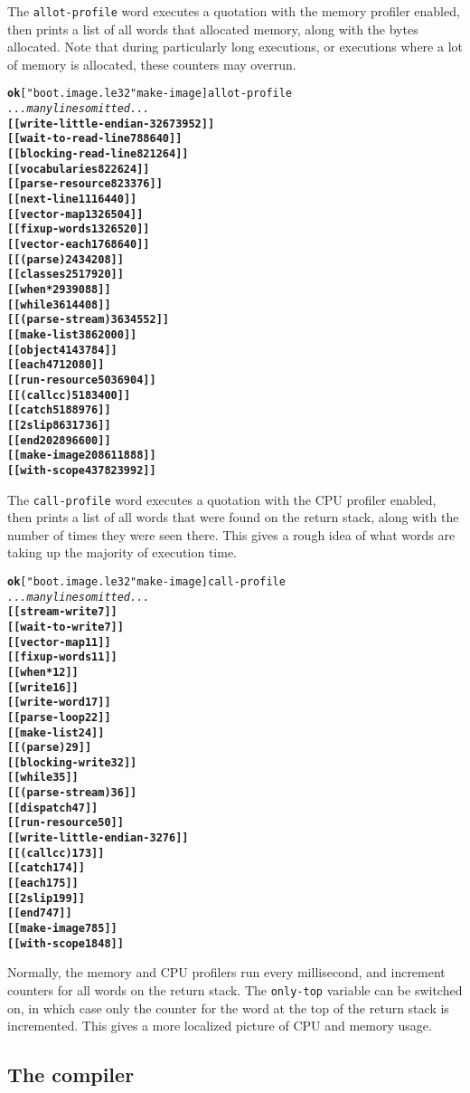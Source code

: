 \documentclass{report}
\begin{document}
The \texttt{allot-profile} word executes a quotation with the memory profiler enabled, then prints a list of all words that allocated memory, along with the bytes allocated. Note that during particularly long executions, or executions where a lot of memory is allocated, these counters may overrun.

\begin{alltt}
\textbf{ok} [ "boot.image.le32" make-image ] allot-profile
\emph{... many lines omitted ...}
\textbf{[[ write-little-endian-32 673952 ]]
[[ wait-to-read-line 788640 ]]
[[ blocking-read-line 821264 ]]
[[ vocabularies 822624 ]]
[[ parse-resource 823376 ]]
[[ next-line 1116440 ]]
[[ vector-map 1326504 ]]
[[ fixup-words 1326520 ]]
[[ vector-each 1768640 ]]
[[ (parse) 2434208 ]]
[[ classes 2517920 ]]
[[ when* 2939088 ]]
[[ while 3614408 ]]
[[ (parse-stream) 3634552 ]]
[[ make-list 3862000 ]]
[[ object 4143784 ]]
[[ each 4712080 ]]
[[ run-resource 5036904 ]]
[[ (callcc) 5183400 ]]
[[ catch 5188976 ]]
[[ 2slip 8631736 ]]
[[ end 202896600 ]]
[[ make-image 208611888 ]]
[[ with-scope 437823992 ]]}
\end{alltt}

The \texttt{call-profile} word executes a quotation with the CPU profiler enabled, then prints a list of all words that were found on the return stack, along with the number of times they were seen there. This gives a rough idea of what words are taking up the majority of execution time.

\begin{alltt}
\textbf{ok} [ "boot.image.le32" make-image ] call-profile
\emph{... many lines omitted ...}
\textbf{[[ stream-write 7 ]]
[[ wait-to-write 7 ]]
[[ vector-map 11 ]]
[[ fixup-words 11 ]]
[[ when* 12 ]]
[[ write 16 ]]
[[ write-word 17 ]]
[[ parse-loop 22 ]]
[[ make-list 24 ]]
[[ (parse) 29 ]]
[[ blocking-write 32 ]]
[[ while 35 ]]
[[ (parse-stream) 36 ]]
[[ dispatch 47 ]]
[[ run-resource 50 ]]
[[ write-little-endian-32 76 ]]
[[ (callcc) 173 ]]
[[ catch 174 ]]
[[ each 175 ]]
[[ 2slip 199 ]]
[[ end 747 ]]
[[ make-image 785 ]]
[[ with-scope 1848 ]]}
\end{alltt}

Normally, the memory and CPU profilers run every millisecond, and increment counters for all words on the return stack. The \texttt{only-top} variable can be switched on, in which case only the counter for the word at the top of the return stack is incremented. This gives a more localized picture of CPU and memory usage.

\subsection{\label{compiler}The compiler}
\end{document}
